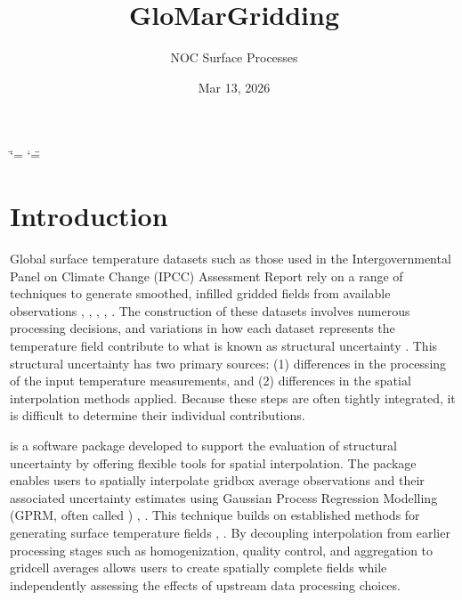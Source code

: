 \documentclass[letterpaper,10pt,english]{sphinxmanual}
\title{GloMarGridding}
\date{Mar 13, 2026}
\author{NOC Surface Processes}
\begin{document}
\ifdefined\shorthandoff
  \ifnum\catcode`\=\string=\active\shorthandoff{=}\fi
  \ifnum\catcode`\"=\active{}\fi
\fi

\pagestyle{empty}
\sphinxmaketitle
\pagestyle{plain}
\sphinxtableofcontents
\pagestyle{normal}
\label{\detokenize{index::doc}}


\sphinxstepscope


\chapter{Introduction}
\label{\detokenize{introduction:introduction}}\label{\detokenize{introduction::doc}}
\sphinxAtStartPar
Global surface temperature datasets \sphinxhyphen{} such as those used in the Intergovernmental Panel on Climate
Change (IPCC) Assessment Report  rely on a range of techniques to generate smoothed, infilled
gridded fields from available observations , , , ,
 . The construction of these datasets involves numerous processing decisions, and variations
in how each dataset represents the temperature field contribute to what is known as structural
uncertainty . This structural uncertainty has two primary sources: (1) differences in the
processing of the input temperature measurements, and (2) differences in the spatial interpolation
methods applied. Because these steps are often tightly integrated, it is difficult to determine
their individual contributions.

\sphinxAtStartPar
{} is a software package developed to support the evaluation of structural
uncertainty by offering flexible tools for spatial interpolation. The package enables users to
spatially interpolate grid\sphinxhyphen{}box average observations and their associated uncertainty estimates using
Gaussian Process Regression Modelling (GPRM, often called ) ,  . This
technique builds on established methods for generating surface temperature fields ,
. By decoupling interpolation from earlier processing stages \sphinxhyphen{} such as homogenization,
quality control, and aggregation to grid\sphinxhyphen{}cell averages \sphinxhyphen{}  allows users to create
spatially complete fields while independently assessing the effects of upstream data processing
choices.
\end{document}
